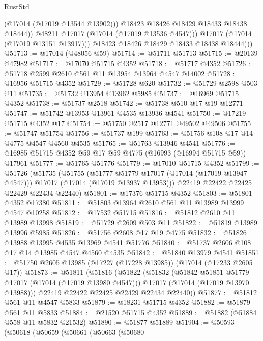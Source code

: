 \begin{lexlean}{RustStd}
\begin{coremodule}
{\begin{coremodule}
{{{{{{{{{{{{{{{{{{{{{{{{{{{{{{{{{{{{{{{{{{{{{{{{{{{{{{{                    (@17014 (@17019 @13544 @13902)))
                  @18423
                  @18426
                  @18429
                  @18433
                  @18438
                  @18444))
              @48211
              @17017
              (@17014 (@17019 @13536 @4547)))
            @17017
            (@17014 (@17019 @13151 @13917)))
          @18423
          @18426
          @18429
          @18433
          @18438
          @18444)))
@51713 := @17014 (@48056 @59)
@51714 := @51711 @51713
@51715 := @20139 @47982
@51717 := @17070 @51715 @4352
@51718 := @51717 @4352
@51726 := @51718 @2599 @2610 @561 @11 @13954 @13964 @4547 @14002
@51728 := @16956 @51715 @4352
@51729 := @51728 @620
@51732 := @51729 @2598 @503 @11
@51735 := @51732 @13954 @13962 @5985
@51737 := @16969 @51715 @4352
@51738 := @51737 @2518
@51742 := @51738 @510 @17 @19 @12771
@51747 := @51742 @13953 @13961 @4535 @13936 @4541
@51750 := @17219 @51715 @4352 @17
@51754 := @51750 @2517 @12771 @49502 @49506
@51755 := @51747 @51754
@51756 := @51737 @199
@51763 := @51756 @108 @17 @14 @4775 @4547 @4560 @4535
@51765 := @51763 @13946 @4541
@51776 := @16985 @51715 @4352 @59 @17 @59 @4775 (@16993 (@16994 @51715 @59)) @17961
@51777 := @51765 @51776
@51779 := @17010 @51715 @4352
@51799 := @51726
    (@51735
      (@51755
        (@51777 @51779 @17017 (@17014 (@17019 @13947 @4547)))
        @17017
        (@17014 (@17019 @13937 @13953)))
      @22419
      @22422
      @22425
      @22429
      @22434
      @22440)
@51801 := @17376 @51715 @4352
@51803 := @51801 @4352 @17380
@51811 := @51803 @13964 @2610 @561 @11 @13989 @13999 @4547 @10258
@51812 := @17532 @51715
@51816 := @51812 @2610 @11 @13989 @13998
@51819 := @51729 @2609 @503 @11
@51822 := @51819 @13989 @13996 @5985
@51826 := @51756 @2608 @17 @19 @4775
@51832 := @51826 @13988 @13995 @4535 @13969 @4541 @51776
@51840 := @51737 @2606 @108 @17 @14 @13985 @4547 @4560 @4535
@51842 := @51840 @13979 @4541
@51851 := @51750 @2605 @13985 (@17227 (@17228 @13985)) (@17014 (@17233 @2605 @17))
@51873 := @51811
    (@51816
      (@51822
        (@51832
          (@51842 @51851 @51779 @17017 (@17014 (@17019 @13980 @4547)))
          @17017
          (@17014 (@17019 @13970 @13988)))
        @22419
        @22422
        @22425
        @22429
        @22434
        @22440))
@51877 := @51812 @561 @11 @4547 @5833
@51879 := @18231 @51715 @4352
@51882 := @51879 @561 @11 @5833
@51884 := @21520 @51715 @4352
@51889 := @51882 (@51884 @558 @11 @5832 @21532)
@51890 := @51877 @51889
@51904 := @50593
    (@50618
      (@50659
        (@50661
          (@50663
            (@50680
}}}}}}}}}}}}}}}}}}}}}}}}}}}}}}}}}}}}}}}}}}}}}}}}}}}}}}}
\end{coremodule}}
\end{coremodule}
\end{lexlean}
